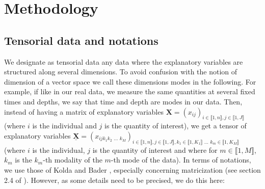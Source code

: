\documentclass[preprint,12pt]{elsarticle}
\begin{document}
\section{Methodology}

\subsection{Tensorial data and notations}

\indent We designate as tensorial data any data where the explanatory variables are structured along several dimensions. To avoid confusion with the notion of dimension of a vector space we call these dimensions modes in the following. For example, if like in our real data, we measure the same quantities at several fixed times and depths, we say that time and depth are modes in our data. Then, instead of having a matrix of explanatory variables $\mathbf{X} = (x_{ij})_{i \in \llbracket 1, n \rrbracket, j \in \llbracket 1, J \rrbracket}$ (where $i$ is the individual and $j$ is the quantity of interest), we get a tensor of explanatory variables $\underline{\mathbf{X}} = (x_{ijk_1k_2\text{ ... }k_M})_{i \in \llbracket 1, n \rrbracket, j \in \llbracket 1, J \rrbracket, k_1 \in \llbracket 1, K_1 \rrbracket \text{ ... } k_m \in\llbracket 1, K_M \rrbracket } $  (where $i$ is the individual, $j$ is the quantity of interest and where for $m \in \llbracket 1, M \rrbracket$, $k_m$ is the $k_m$-th modality of the $m$-th mode of the data). In terms of notations, we use those of Kolda and Bader \cite{conventions}, especially concerning matricization (see section 2.4 of \cite{conventions}). However, as some details need to be precised, we do this here:\\
\end{document}
